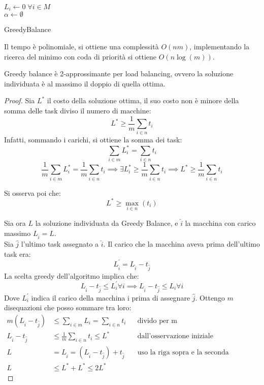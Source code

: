 \begin{algorithm}[H]
    \SetAlgoLined
     $L_i \gets 0\;\forall i \in M$\\
     $\alpha \gets \emptyset$\\
     \Return{$\alpha$}
     \caption{GreedyBalance}
\end{algorithm}
Il tempo è polinomiale, si ottiene una complessità $O(nm)$, implementando 
la ricerca del minimo con coda di priorità si ottiene $O(n\log(m))$.
\begin{theorem}
    Greedy balance è 2-approssimante per load balancing, ovvero la soluzione
    individuata è al massimo il doppio di quella ottima.
\end{theorem}
\begin{proof}
    Sia $L^*$ il costo della soluzione ottima, il suo costo non è minore
    della somma delle task diviso il numero di macchine:
    $$L^* \geq \frac{1}{m}\sum_{i \in n} t_i$$
    Infatti, sommando i carichi, si ottiene la somma dei task:
    $$\sum_{i \in m} L_i^* = \sum_{i \in n} t_i$$
    $$\frac{1}{m}\sum_{i \in m} L_i^* = \frac{1}{m}\sum_{i \in n} t_i 
    \implies \exists L_i^* \geq \frac{1}{m}\sum_{i \in n} t_i 
    \implies L^* \geq \frac{1}{m}\sum_{i \in n} t_i$$
    
    Si osserva poi che:
    $$L^* \geq \max_{i \in n}(t_i)$$

    Sia ora $L$ la soluzione individuata da Greedy Balance, e $\hat{i}$
    la macchina con carico massimo $L_{\hat{i}} = L$.\\
    Sia $\hat{j}$ l'ultimo task assegnato a $\hat{i}$. Il carico 
    che la macchina aveva prima dell'ultimo task era:
    $$L_{\hat{i}}^\prime = L_{\hat{i}} - t_{\hat{j}}$$
    La scelta greedy dell'algoritmo implica che:
        $$L_{\hat{i}} - t_{\hat{j}} \leq L_{i}^\prime \forall i \implies L_{\hat{i}} - t_{\hat{j}} \leq L_{i} \forall i$$
    Dove $L_i^\prime$ indica il carico della macchina i prima di assegnare $\hat{j}$. 
    Ottengo $m$ disequazioni che posso sommare tra loro:
    \begin{equation}
        \begin{aligned}
            m(L_{\hat{i}} - t_{\hat{j}}) &\leq \sum_{i \in m}L_{i} =  \sum_{i \in n}t_{i} && \text{divido per m}\\
            L_{\hat{i}} - t_{\hat{j}} &\leq \frac{1}{m}\sum_{i \in n}t_{i} \leq L^* && \text{dall'osservazione iniziale}\\
            L &= L_{\hat{i}} = (L_{\hat{i}} - t_{\hat{j}}) + t_{\hat{j}}  && \text{uso la riga sopra e la seconda osservazione}\\
            L &\leq L^* + L^* \leq 2L^*
        \end{aligned}
    \end{equation}

\end{proof}
